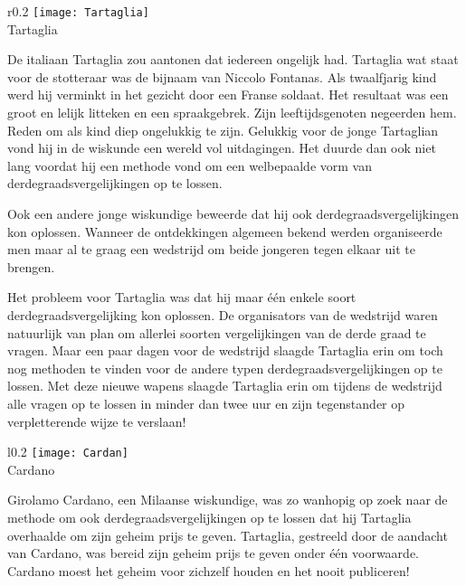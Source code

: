\begin{wrapfigure}[9]{r}{0.2\textwidth}
  \centering
  \vspace*{-0.5cm}
  \texttt{[image: Tartaglia]}\\
  Tartaglia
\end{wrapfigure}

De italiaan Tartaglia zou aantonen dat iedereen ongelijk had. Tartaglia wat staat voor de stotteraar was de bijnaam van Niccolo Fontanas. Als twaalfjarig kind werd hij verminkt in het gezicht door een Franse soldaat. Het resultaat was een groot en lelijk litteken en een spraakgebrek. Zijn leeftijdsgenoten negeerden hem. Reden om als kind diep ongelukkig te zijn. Gelukkig voor de jonge Tartaglian vond hij in de wiskunde een wereld vol uitdagingen. Het duurde dan ook niet lang voordat hij een methode vond om een welbepaalde vorm van derdegraadsvergelijkingen op te lossen.

Ook een andere jonge wiskundige beweerde dat hij ook derdegraadsvergelijkingen kon oplossen. Wanneer de ontdekkingen algemeen bekend werden organiseerde men maar al te graag een wedstrijd om beide jongeren tegen elkaar uit te brengen.

Het probleem voor Tartaglia was dat hij maar \'e\'en enkele soort derdegraadsvergelijking kon oplossen. De organisators van de wedstrijd waren natuurlijk van plan om allerlei soorten vergelijkingen van de derde graad te vragen. Maar een paar dagen voor de wedstrijd slaagde Tartaglia erin om toch nog methoden te vinden voor de andere typen derdegraadsvergelijkingen op te lossen. Met deze nieuwe wapens slaagde Tartaglia erin om tijdens de wedstrijd alle vragen op te lossen in minder dan twee uur en zijn tegenstander op verpletterende wijze te verslaan!

\begin{wrapfigure}[9]{l}{0.2\textwidth}
  \centering
  \vspace*{-0.5cm}
  \texttt{[image: Cardan]}\\
  Cardano
\end{wrapfigure}

Girolamo Cardano, een Milaanse wiskundige, was zo wanhopig op zoek naar de methode om ook derdegraadsvergelijkingen op te lossen dat hij Tartaglia overhaalde om zijn geheim prijs te geven. Tartaglia, gestreeld door de aandacht van Cardano, was bereid zijn geheim prijs te geven onder \'e\'en voorwaarde. Cardano moest het geheim voor zichzelf houden en het nooit publiceren!

